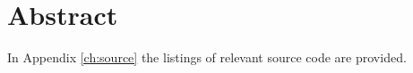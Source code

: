 \chapter*{Abstract} %
\label{ch:abstract}


%


%
%
%
%
%

In Appendix \ref{ch:source} the listings of relevant source code are provided.
